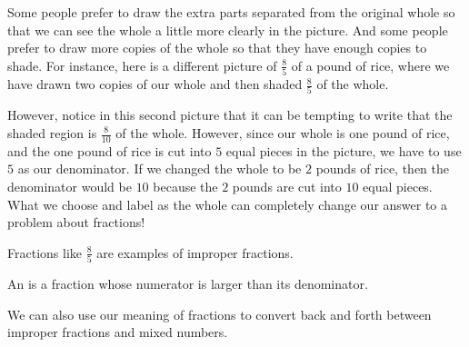 \documentclass{ximera}
\begin{document}
\begin{example}
Some people prefer to draw the extra parts separated from the original whole so that we can see the whole a little more clearly in the picture. And some people prefer to draw more copies of the whole so that they have enough copies to shade. For instance, here is a different picture of $\frac{8}{5}$ of a pound of rice, where we have drawn two copies of our whole and then shaded $\frac{8}{5}$ of the whole.

\begin{center} \end{center}

However, notice in this second picture that it can be tempting to write that the shaded region is $\frac{8}{10}$ of the whole. However, since our whole is one pound of rice, and the one pound of rice is cut into $5$ equal pieces in the picture, we have to use $5$ as our denominator. If we changed the whole to be $2$ pounds of rice, then the denominator would be $10$ because the $2$ pounds are cut into $10$ equal pieces. What we choose and label as the whole can completely change our answer to a problem about fractions!

\end{example}

Fractions like $\frac{8}{5}$ are examples of improper fractions.

\begin{definition}
An  is a fraction whose numerator is larger than its denominator.
\end{definition}

We can also use our meaning of fractions to convert back and forth between improper fractions and mixed numbers.
\end{document}
